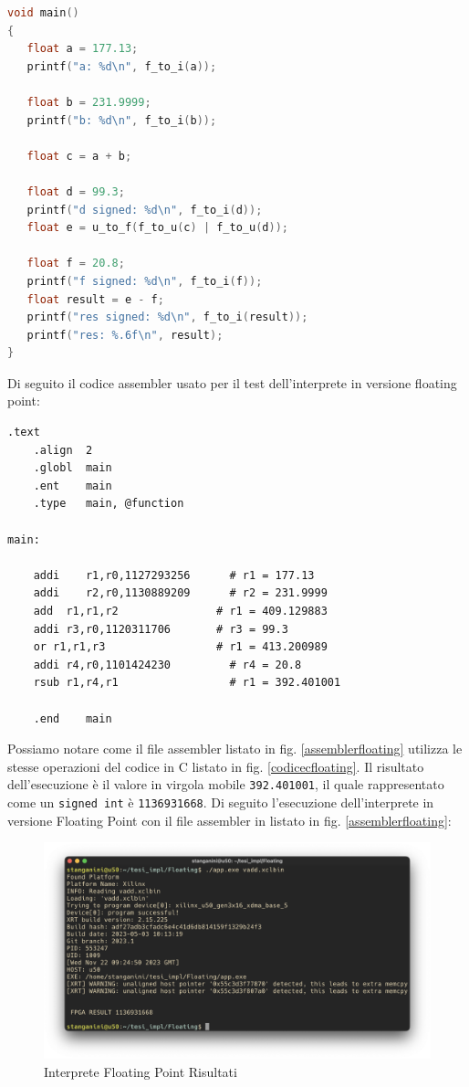 \begin{lstlisting}[language=C,label={codicecfloating},caption={Codice valori conversione floating}]
void main()
{
   float a = 177.13;
   printf("a: %d\n", f_to_i(a));

   float b = 231.9999;
   printf("b: %d\n", f_to_i(b));
   
   float c = a + b;

   float d = 99.3;
   printf("d signed: %d\n", f_to_i(d));
   float e = u_to_f(f_to_u(c) | f_to_u(d));

   float f = 20.8;
   printf("f signed: %d\n", f_to_i(f));
   float result = e - f;
   printf("res signed: %d\n", f_to_i(result));
   printf("res: %.6f\n", result);
}
\end{lstlisting}
Di seguito il codice assembler usato per il test dell'interprete in versione floating point: 

\begin{lstlisting}[caption={File Assembler per Test Floating Point},label={assemblerfloating}]
	.text
	.align	2
	.globl	main
	.ent	main
	.type	main, @function       

main:

	addi	r1,r0,1127293256      # r1 = 177.13
	addi	r2,r0,1130889209      # r2 = 231.9999
	add  r1,r1,r2               # r1 = 409.129883
	addi r3,r0,1120311706       # r3 = 99.3
	or r1,r1,r3                 # r1 = 413.200989
	addi r4,r0,1101424230	      # r4 = 20.8
	rsub r1,r4,r1	              # r1 = 392.401001

	.end	main
\end{lstlisting}
Possiamo notare come il file assembler listato in fig. \ref{assemblerfloating} utilizza le stesse operazioni del codice in C listato in fig. \ref{codicecfloating}. Il risultato dell'esecuzione è il valore in virgola mobile \texttt{392.401001}, il quale rappresentato come un \texttt{signed int} è \texttt{1136931668}. Di seguito l'esecuzione dell'interprete in versione Floating Point con il file assembler in listato in fig. \ref{assemblerfloating}:

\clearpage

\begin{figure}[h!]
\centering
\includegraphics[scale=0.35]{images/Capitolo5/11_im.png}
\caption{Interprete Floating Point Risultati}
\label{4curisultati}
\end{figure}


